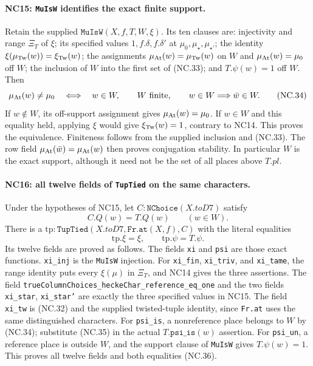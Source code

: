 \paragraph{NC15: \texttt{MuIsW} identifies the exact finite support.}
Retain the supplied \(\texttt{MuIsW}(X,f,T,W,\xi)\).
Its ten clauses are: injectivity and range \(\Xi_T\) of
\(\xi\); its specified values \(1,f.\delta,f.\delta'\)
at \(\mu_0,\mu_\star,\mu_{\star'}\); the identity
\(\xi(\mu_{\rm Tw}(w))=\xi_{\rm Tw}(w)\); the assignments
\(\mu_{\rm At}(w)=\mu_{\rm Tw}(w)\) on \(W\) and
\(\mu_{\rm At}(w)=\mu_0\) off \(W\); the inclusion
of \(W\) into the first set of (NC.33); and
\(T.\psi(w)=1\) off \(W\).
Then
\[
 \mu_{\rm At}(w)\ne\mu_0\quad\Longleftrightarrow\quad w\in W,
 \qquad W\text{ finite},\qquad
 w\in W\Longrightarrow\bar w\in W.
 \tag{NC.34}
\]
If \(w\notin W\), its off-support assignment gives
\(\mu_{\rm At}(w)=\mu_0\).
If \(w\in W\) and this equality held, applying \(\xi\)
would give \(\xi_{\rm Tw}(w)=1\), contrary to NC14.
This proves the equivalence. Finiteness follows from
the supplied inclusion and (NC.33).
The row field \(\mu_{\rm At}(\bar w)=\mu_{\rm At}(w)\)
then proves conjugation stability.
In particular \(W\) is the exact support, although it
need not be the set of all places above \(T.pl\).

\paragraph{NC16: all twelve fields of \texttt{TupTied} on the same characters.}
Under the hypotheses of NC15, let
\(C:\texttt{NChoice}(X.toD7)\) satisfy
\[
 C.Q(w)=T.Q(w)\qquad(w\in W).
 \tag{NC.35}
\]
There is a
\(\mathrm{tp}:\texttt{TupTied}(X.toD7,\texttt{Fr.at}(X,f),C)\)
with the literal equalities
\[
 \mathrm{tp}.\xi=\xi,\qquad
 \mathrm{tp}.\psi=T.\psi.
 \tag{NC.36}
\]
Its twelve fields are proved as follows.
The fields \texttt{xi} and \texttt{psi} are those exact
functions. \texttt{xi\_inj} is the \texttt{MuIsW} injection.
For \texttt{xi\_fin}, \texttt{xi\_triv}, and
\texttt{xi\_tame}, the range identity puts every
\(\xi(\mu)\) in \(\Xi_T\), and NC14 gives the three assertions.
The field
\texttt{trueColumnChoices\_heckeChar\_reference\_eq\_one}
and the two fields \texttt{xi\_star}, \texttt{xi\_star'}
are exactly the three specified values in NC15.
The field \texttt{xi\_tw} is (NC.32) and the supplied
twisted-tuple identity, since \texttt{Fr.at} uses the same
distinguished characters.
For \texttt{psi\_is}, a nonreference place belongs to \(W\)
by (NC.34); substitute (NC.35) in the actual
\(T.\texttt{psi\_is}(w)\) assertion.
For \texttt{psi\_un}, a reference place is outside \(W\),
and the support clause of \texttt{MuIsW} gives \(T.\psi(w)=1\).
This proves all twelve fields and both equalities (NC.36).

